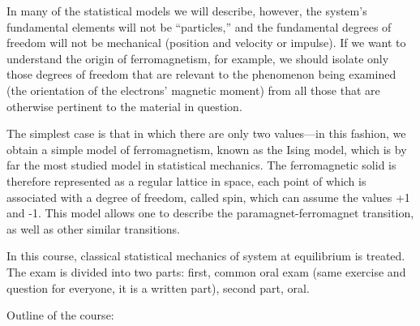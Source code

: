 \documentclass[11pt, a4paper, twoside, openright]{book}
\begin{document}
In many of the statistical models we will describe, however, the system’s fundamental elements will not be “particles,” and the fundamental degrees of freedom will not be mechanical (position and velocity or impulse). If we want to understand the origin of ferromagnetism, for example, we should isolate only those degrees of freedom that are relevant to the phenomenon being examined (the orientation of the electrons’ magnetic moment) from all those that are otherwise pertinent to the material in question.

The simplest case is that in which there are only two values—in this fashion, we obtain a simple model of ferromagnetism, known as the Ising model, which is by far the most studied model in statistical mechanics. The ferromagnetic solid is therefore represented as a regular lattice in space, each point of which is associated with a degree of freedom, called spin, which can assume the values +1 and -1. This model allows one to describe the paramagnet-ferromagnet transition, as well as other similar transitions.

In this course, classical statistical mechanics of system at equilibrium is treated. 
The exam is divided into two parts: first, common oral exam (same exercise and question for everyone, it is a written part), second part, oral.

\clearpage
Outline of the course:
\end{document}
